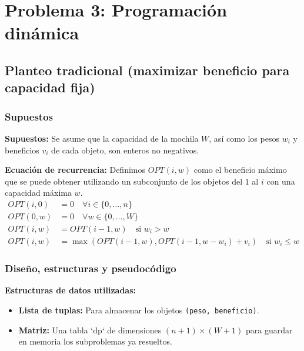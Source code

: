\documentclass[11pt,a4paper]{article}
\begin{document}
\newpage

\section{Problema 3: Programación dinámica}
\label{sec:problema3}

\subsection{Planteo tradicional (maximizar beneficio para capacidad fija)}

\subsubsection{Supuestos}
\textbf{Supuestos:} Se asume que la capacidad de la mochila $W$, así como los pesos $w_i$ y beneficios $v_i$ de cada objeto, son enteros no negativos.

\textbf{Ecuación de recurrencia:} Definimos $OPT(i, w)$ como el beneficio máximo que se puede obtener utilizando un subconjunto de los objetos del $1$ al $i$ con una capacidad máxima $w$.
\begin{align*}
    OPT(i, 0) &= 0 \quad \forall i \in \{0, \dots, n\} \\
    OPT(0, w) &= 0 \quad \forall w \in \{0, \dots, W\} \\
    OPT(i, w) &= OPT(i-1, w) \quad \text{si } w_i > w \\
    OPT(i, w) &= \max(OPT(i-1, w), OPT(i-1, w-w_i) + v_i) \quad \text{si } w_i \le w
\end{align*}

\subsubsection{Diseño, estructuras y pseudocódigo}
\textbf{Estructuras de datos utilizadas:}
\begin{itemize}
    \item \textbf{Lista de tuplas:} Para almacenar los objetos \texttt{(peso, beneficio)}.
    \item \textbf{Matriz:} Una tabla `dp` de dimensiones $(n+1) \times (W+1)$ para guardar en memoria los subproblemas ya resueltos.
\end{itemize}
\end{document}

